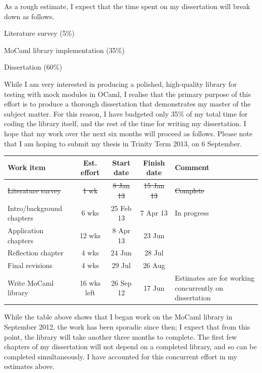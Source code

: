 \documentclass[proposal]{softeng}
\begin{document}
As a rough estimate, I expect that the time spent on my dissertation
will break down as follows.

\begin{itemize*}
  \item Literature survey (5\%)
  \item MoCaml library implementation (35\%)
  \item Dissertation (60\%)
\end{itemize*}

While I am very interested in producing a polished, high-quality
library for testing with mock modules in OCaml, I realise that the
primary purpose of this effort is to produce a thorough dissertation
that demonstrates my master of the subject matter. For this reason, I
have budgeted only 35\% of my total time for coding the library
itself, and the rest of the time for writing my dissertation. I hope
that my work over the next six months will proceed as follows. Please
note that I am hoping to submit my thesis in Trinity Term 2013, on 6
September.
\\

\begin{center}
\begin{tabular}{l | c | c | c | p{3cm}}
  \bf{Work item} & \bf{Est. effort} & \bf{Start date} & \bf{Finish date} & \bf{Comment} \\
  \hline
  \sout{Literature survey} & \sout{1 wk} & \sout{8 Jan 13} & \sout{15 Jan 13} &
    \sout{Complete} \\
  Intro/background chapters & 6 wks & 25 Feb 13 & 7 Apr 13 & In progress \\
  Application chapters & 12 wks & 8 Apr 13 & 23 Jun & \\
  Reflection chapter & 4 wks & 24 Jun & 28 Jul & \\
  Final revisions & 4 wks & 29 Jul & 26 Aug & \\
  \hline
  Write MoCaml library & 16 wks left & 26 Sep 12 & 17 Jun & Estimates are for working concurrently on dissertation \\
\end{tabular}
\end{center}

While the table above shows that I began work on the MoCaml library in
September 2012, the work has been sporadic since then; I expect that
from this point, the library will take another three months to
complete. The first few chapters of my dissertation will not depend on
a completed library, and so can be completed simultaneously. I have
accounted for this concurrent effort in my estimates above.
\end{document}
